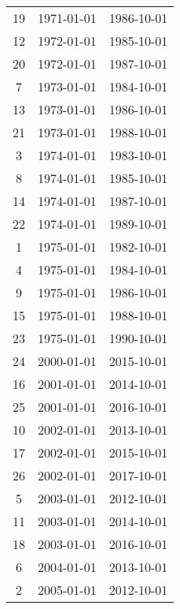 % 
\begin{tabular}{ccc}
  \hline
  \hline
19 & 1971-01-01 & 1986-10-01 \\ 
  12 & 1972-01-01 & 1985-10-01 \\ 
  20 & 1972-01-01 & 1987-10-01 \\ 
  7 & 1973-01-01 & 1984-10-01 \\ 
  13 & 1973-01-01 & 1986-10-01 \\ 
  21 & 1973-01-01 & 1988-10-01 \\ 
  3 & 1974-01-01 & 1983-10-01 \\ 
  8 & 1974-01-01 & 1985-10-01 \\ 
  14 & 1974-01-01 & 1987-10-01 \\ 
  22 & 1974-01-01 & 1989-10-01 \\ 
  1 & 1975-01-01 & 1982-10-01 \\ 
  4 & 1975-01-01 & 1984-10-01 \\ 
  9 & 1975-01-01 & 1986-10-01 \\ 
  15 & 1975-01-01 & 1988-10-01 \\ 
  23 & 1975-01-01 & 1990-10-01 \\ 
  24 & 2000-01-01 & 2015-10-01 \\ 
  16 & 2001-01-01 & 2014-10-01 \\ 
  25 & 2001-01-01 & 2016-10-01 \\ 
  10 & 2002-01-01 & 2013-10-01 \\ 
  17 & 2002-01-01 & 2015-10-01 \\ 
  26 & 2002-01-01 & 2017-10-01 \\ 
  5 & 2003-01-01 & 2012-10-01 \\ 
  11 & 2003-01-01 & 2014-10-01 \\ 
  18 & 2003-01-01 & 2016-10-01 \\ 
  6 & 2004-01-01 & 2013-10-01 \\ 
  2 & 2005-01-01 & 2012-10-01 \\ 
   \hline
\end{tabular}
